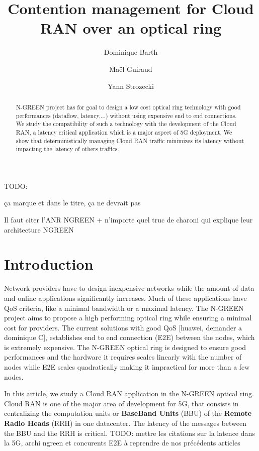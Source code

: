\documentclass[]{algotel}
\title{Contention management for Cloud RAN over an optical ring}
\author{Dominique Barth\addressmark{1}
  \and Ma\"el Guiraud \addressmark{1,2}
   \and Yann Strozecki \addressmark{1}
  }
\newcommand{\todo}[1]{{\color{red} TODO: {#1}}}
\begin{document}
\maketitle


\begin{abstract}

N-GREEN project has for goal to design a low cost optical ring technology with good performances (dataflow, latency,$\dots$) without using expensive end to end connections. We study the compatibility of such a technology with the development of the Cloud RAN, a latency critical application which is a major aspect of 5G deployment. We show that deterministically managing Cloud RAN traffic minimizes its latency without impacting the latency of others traffics. 
\end{abstract}

\todo{ça marque et dans le titre, ça ne devrait pas

Il faut citer l'ANR NGREEN + n'importe quel truc de charoni qui explique leur architecture NGREEN}


\section{Introduction}

Network providers have to design inexpensive networks while the amount of data and online applications significantly increases. Much of these applications have QoS criteria, like a minimal bandwidth or a maximal latency. The N-GREEN project aims to propose a high performing optical ring while ensuring a minimal cost for providers. The current solutions with good QoS [huawei, demander a dominique C], establishes end to end connection (E2E) between the nodes, which is extremely expensive. The N-GREEN optical ring is designed to ensure good performances and the hardware it requires scales linearly with the number of nodes while E2E scales quadratically making it impractical for more than a few nodes.

In this article, we study a Cloud RAN application in the N-GREEN optical ring. Cloud RAN is one of the major area of development for 5G, that consists in centralizing the computation units or {\bf BaseBand Units} (BBU) of the {\bf Remote Radio Heads} (RRH) in one datacenter. The latency of the messages between the BBU and the RRH is critical. \todo{mettre les citations sur la latence dans la 5G, archi ngreen et concurents E2E à reprendre de nos précédents articles}
\end{document}
